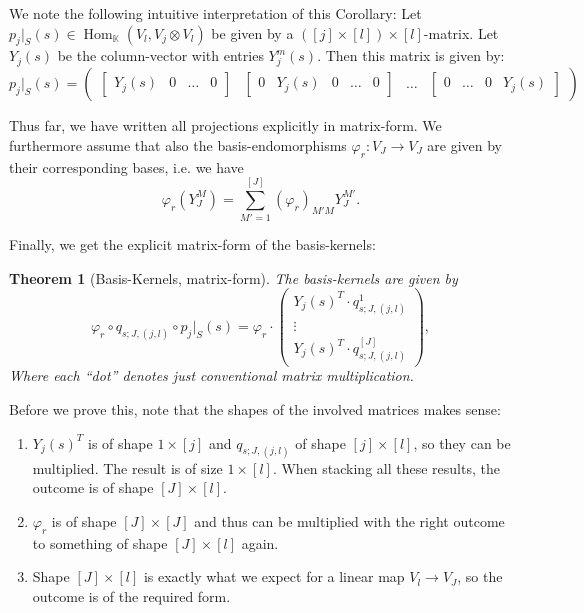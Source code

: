\documentclass[12pt, a4paper]{article}
\theoremstyle{plain}
\newtheorem{thm}[pro]{Theorem}
\theoremstyle{definition}
\theoremstyle{remark}
\newcommand{\K}{\mathds{K}}
\DeclareMathOperator{\Hom}{Hom}
\begin{document}
We note the following intuitive interpretation of this Corollary: Let $p_j|_S(s) \in \Hom_\K(V_l, V_j \otimes V_l)$ be given by a $([j] \times [l]) \times [l]$-matrix. Let $Y_j(s)$ be the column-vector with entries $Y_j^m(s)$. Then this matrix is given by:
\begin{equation*}
p_j|_S(s) = \begin{pmatrix}
\begin{bmatrix}
Y_j(s) & 0 & \hdots & 0
\end{bmatrix}
&
\begin{bmatrix}
0 & Y_j(s) & 0 & \hdots & 0
\end{bmatrix}
&
\hdots
&
\begin{bmatrix}
0 & \hdots & 0 & Y_j(s)
\end{bmatrix}
\end{pmatrix}
\end{equation*}

Thus far, we have written all projections explicitly in matrix-form. We furthermore assume that also the basis-endomorphisms $\varphi_r: V_J \to V_J$ are given by their corresponding bases, i.e. we have
\begin{equation*}
\varphi_r(Y_J^M) = \sum_{M' = 1}^{[J]} \left( \varphi_r\right)_{M'M} Y_J^{M'}.
\end{equation*}

Finally, we get the explicit matrix-form of the basis-kernels:

\begin{thm}[Basis-Kernels, matrix-form]\label{matrix-form}
The basis-kernels are given by
\begin{equation*}
\varphi_r \circ q_{s; J, (j,l)} \circ p_j|_S(s) = \varphi_r \cdot \begin{pmatrix} 
Y_j(s)^T \cdot q^1_{s; J, (j,l)} \\
\vdots \\
Y_j(s)^T \cdot q^{[J]}_{s; J, (j,l)}
\end{pmatrix},
\end{equation*}
Where each ``dot'' denotes just conventional matrix multiplication.
\end{thm}

Before we prove this, note that the shapes of the involved matrices makes sense:
\begin{enumerate}
\item $Y_j(s)^T$ is of shape $1 \times [j]$ and $q_{s;J,(j,l)}$ of shape $[j] \times [l]$, so they can be multiplied. The result is of size $1 \times [l]$. When stacking all these results, the outcome is of shape $[J] \times [l]$.
\item $\varphi_r$ is of shape $[J] \times [J]$ and thus can be multiplied with the right outcome to something of shape $[J] \times [l]$ again.
\item Shape $[J] \times [l]$ is exactly what we expect for a linear map $V_l \to V_J$, so the outcome is of the required form.
\end{enumerate}
\end{document}
